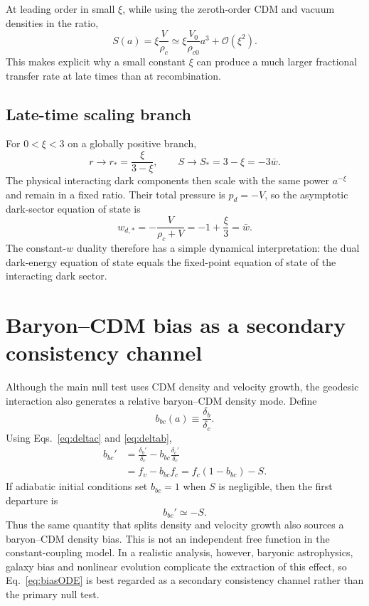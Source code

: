 \documentclass[11pt]{article}
\theoremstyle{remark}
\begin{document}
At leading order in small $\xi$, while using the zeroth-order CDM and vacuum densities in the ratio,
\begin{equation}
    S(a)
    =\xi\frac{V}{\rho_c}
    \simeq
    \xi\frac{V_0}{\rho_{c0}}a^3+\mathcal O(\xi^2).
    \label{eq:weakS}
\end{equation}
This makes explicit why a small constant $\xi$ can produce a much larger fractional transfer rate at late times than at recombination.

\subsection{Late-time scaling branch}

For $0<\xi<3$ on a globally positive branch,
\begin{equation}
    r\longrightarrow r_*=\frac{\xi}{3-\xi},
    \qquad
    S\longrightarrow S_*=3-\xi=-3\bar w.
    \label{eq:lateS}
\end{equation}
The physical interacting dark components then scale with the same power $a^{-\xi}$ and remain in a fixed ratio.  Their total pressure is $p_d=-V$, so the asymptotic dark-sector equation of state is
\begin{equation}
    w_{d,*}
    =-\frac{V}{\rho_c+V}
    =-1+\frac{\xi}{3}
    =\bar w.
    \label{eq:latew}
\end{equation}
The constant-$w$ duality therefore has a simple dynamical interpretation: the dual dark-energy equation of state equals the fixed-point equation of state of the interacting dark sector.

\section{Baryon--CDM bias as a secondary consistency channel}
\label{sec:bias}

Although the main null test uses CDM density and velocity growth, the geodesic interaction also generates a relative baryon--CDM density mode.  Define
\begin{equation}
    b_{bc}(a)\equiv\frac{\delta_b}{\delta_c}.
\end{equation}
Using Eqs.~\eqref{eq:deltac} and \eqref{eq:deltab},
\begin{align}
    b_{bc}'
    &=\frac{\delta_b'}{\delta_c}
    -b_{bc}\frac{\delta_c'}{\delta_c}\nonumber\\
    &=f_v-b_{bc}f_c
    =f_c(1-b_{bc})-S.
    \label{eq:biasODE}
\end{align}
If adiabatic initial conditions set $b_{bc}=1$ when $S$ is negligible, then the first departure is
\begin{equation}
    b_{bc}'\simeq-S.
    \label{eq:biasinitial}
\end{equation}
Thus the same quantity that splits density and velocity growth also sources a baryon--CDM density bias.  This is not an independent free function in the constant-coupling model.  In a realistic analysis, however, baryonic astrophysics, galaxy bias and nonlinear evolution complicate the extraction of this effect, so Eq.~\eqref{eq:biasODE} is best regarded as a secondary consistency channel rather than the primary null test.
\end{document}
